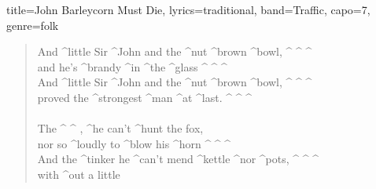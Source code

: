 \documentclass{article}
\begin{document}
\begin{song}{title={John Barleycorn Must Die}, lyrics={traditional}, band={Traffic}, capo={7}, genre={folk}}
\begin{verse}
	\end{verse}
	\begin{chorus*}
		       
	\end{chorus*}
	\begin{verse}
		And ^little Sir ^John and the ^nut ^brown ^bowl, ^ {} ^ {} ^ {} \\
		and he's ^brandy ^in ^the ^glass ^ {} ^ {} ^ {} \\
		And ^little Sir ^John and the ^nut ^brown ^bowl, ^ {} ^ {} ^ {} \\
		proved the ^strongest ^man ^at ^last. ^ {} ^ {} ^ {} \\
		\\
		The ^ {} ^ {}
		, ^he can't ^hunt the fox, \\
		nor so ^loudly to ^blow his ^horn ^ {} ^ {} ^ {} \\
		And the ^tinker he ^can't mend ^kettle ^nor ^pots, ^ {} ^ {} ^ {} \\
		with ^out a little  \\
	\end{verse}
\end{song}
\end{document}
